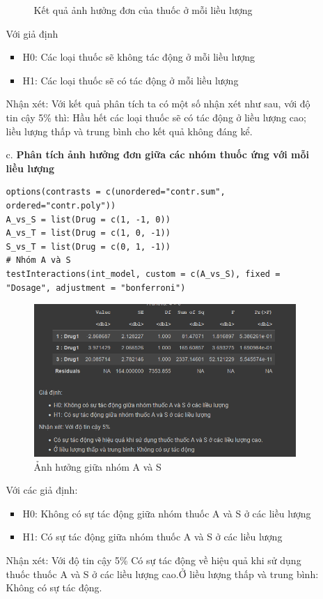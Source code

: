 \begin{itemize}
\begin{itemize}
\begin{figure}[H]
            \caption{Kết quả ảnh hưởng đơn của thuốc ở mỗi liều lượng}
            \label{fig:Kết quả ảnh hưởng đơn của thuốc ở mỗi liều lượng}
        \end{figure}
        Với giả định
        \begin{itemize}
            \item H0: Các loại thuốc sẽ không tác động ở mỗi liều lượng
            \item H1: Các loại thuốc sẽ có tác động ở mỗi liều lượng
        \end{itemize}
        Nhận xét: Với kết quả phân tích ta có một số nhận xét như sau, với độ tin cậy 5\% thì: Hầu hết các loại thuốc sẽ có tác động ở liều lượng cao; liều lượng thấp và trung bình cho kết quả không đáng kể.
         \item [c.] \textbf{Phân tích ảnh hưởng đơn giữa các nhóm thuốc ứng với mỗi liều lượng}
        \begin{lstlisting}
options(contrasts = c(unordered="contr.sum", ordered="contr.poly"))
A_vs_S = list(Drug = c(1, -1, 0))
A_vs_T = list(Drug = c(1, 0, -1))
S_vs_T = list(Drug = c(0, 1, -1))
# Nhóm A và S
testInteractions(int_model, custom = c(A_vs_S), fixed = "Dosage", adjustment = "bonferroni")
        \end{lstlisting}
    \begin{figure}[H]
            \centering
            \includegraphics[width=0.7\linewidth]{part01_figures/27.png}
            \caption{Ảnh hưởng giữa nhóm A và S}
            \label{fig:Ảnh hưởng giữa nhóm A và S}
        \end{figure}
                
        Với các giả định:
        \begin{itemize}
            \item H0: Không có sự tác động giữa nhóm thuốc A và S ở các liều lượng
            \item H1: Có sự tác động giữa nhóm thuốc A và S ở các liều lượng
        \end{itemize}
        Nhận xét: Với độ tin cậy 5\% Có sự tác động về hiệu quả khi sử dụng thuốc thuốc A và S ở các liều lượng cao.Ở liều lượng thấp và trung bình: Không có sự tác động.


\end{itemize}
\end{itemize}
